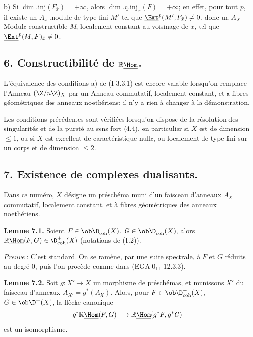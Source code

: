 b) Si $\dim.\mathrm{inj}(F_{\bar{x}})=+\infty$, alors $\dim.\mathrm{q.inj}_{\bar{x}}(F)=+\infty$; en effet, pour tout $p$, il existe un $A_{\bar{x}}$-module de type fini $M'$ tel que $\underline{\Ext}^p(M',F_{\bar{x}})\neq0$, donc un $A_X$-Module constructible $M$, localement constant au voisinage de $x$, tel que $\underline{\Ext}^p(M,F)_{\bar{x}}\neq0$.

\subsection*{6. Constructibilité de $\mathbb{R}\underline{\Hom}$.}

L'équivalence des conditions a) de (I 3.3.1) est encore valable lorsqu'on remplace l'Anneau $(\Z/n\Z)_X$ par un Anneau commutatif, localement constant, et à fibres géométriques des anneaux noethériens: il n'y a rien à changer à la démonstration.

Les conditions précédentes sont vérifiées lorsqu'on dispose de la résolution des singularités et de la pureté au sens fort (4.4), en particulier si $X$ est de dimension $\leq1$, ou si $X$ est excellent de caractéristique nulle, ou localement de type fini sur un corps et de dimension $\leq2$.

\subsection*{7. Existence de complexes dualisants.}

Dans ce numéro, $X$ désigne un préschéma muni d'un faisceau d'anneaux $A_X$ commutatif, localement constant, et à fibres géométriques des anneaux noethériens.

\textbf{Lemme 7.1.} Soient $F\in\ob\D^{-}_{\mathrm{coh}}(X)$, $G\in\ob\D^{+}_{\mathrm{coh}}(X)$, alors $\mathbb{R}\underline{\Hom}(F,G)\in\D^{+}_{\mathrm{coh}}(X)$ (notations de (1.2)).

\emph{Preuve} : C'est standard. On se ramène, par une suite spectrale, à $F$ et $G$ réduits au degré $0$, puis l'on procède comme dans (EGA $0_{\mathrm{III}}$ 12.3.3).

\textbf{Lemme 7.2.} Soit $g:X'\to X$ un morphisme de préschémas, et munissons $X'$ du faisceau d'anneaux $A_{X'}=g^*(A_X)$. Alors, pour $F\in\ob\D^{-}_{\mathrm{coh}}(X)$, $G\in\ob\D^{+}(X)$, la flèche canonique
\[
        g^*\mathbb{R}\underline{\Hom}(F,G)\longrightarrow \mathbb{R}\underline{\Hom}(g^*F,g^*G)
\]
est un isomorphisme.

